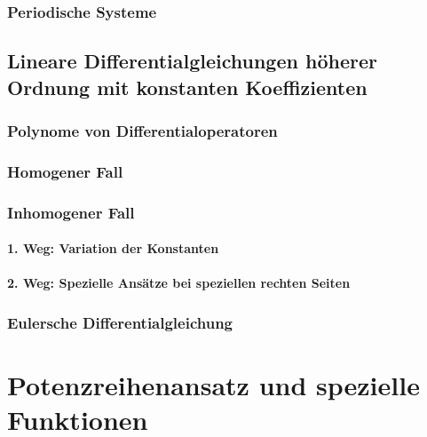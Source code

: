 \documentclass[a4paper, 11pt, accentcolor = tud3b]{tudreport}
\begin{document}
			\subsection{Periodische Systeme} %

		\section{Lineare Differentialgleichungen höherer Ordnung mit konstanten Koeffizienten} %

			\subsection{Polynome von Differentialoperatoren} %

			\subsection{Homogener Fall} %

			\subsection{Inhomogener Fall} %

				\subsubsection{1. Weg: Variation der Konstanten} %

				\subsubsection{2. Weg: Spezielle Ansätze bei speziellen rechten Seiten} %

			\subsection{Eulersche Differentialgleichung} %

	\chapter{Potenzreihenansatz und spezielle Funktionen} %
\end{document}
